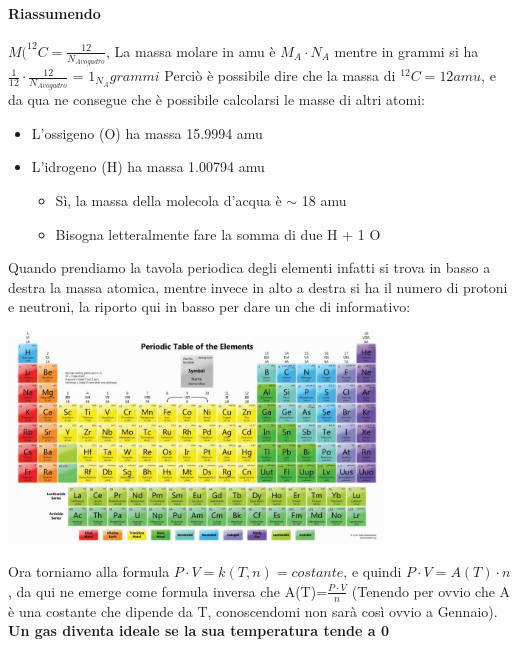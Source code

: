 \documentclass[12pt, a4paper, openany, oneside]{book}
\begin{document}
\paragraph{Riassumendo} $M(^{12}C = \frac{12}{N_{Avogadro}}$, La massa molare in amu è
$M_{A} \cdot N_{A}$  mentre in grammi si ha $\frac{1}{12} \cdot \frac{12}
{N_{Avogadro}}$ = $1_{N_{A}} grammi$
Perciò è possibile dire che la massa di $^{12}C = 12 amu$, e da qua ne consegue
che è possibile calcolarsi le masse di altri atomi:
\begin{itemize}
	\item L'ossigeno (O) ha massa 15.9994 amu
	\item L'idrogeno (H) ha massa 1.00794 amu
	\begin{itemize}
		\item Sì, la massa della molecola d'acqua è $\sim$ 18 amu
		\item Bisogna letteralmente fare la somma di due H + 1 O 
	\end{itemize}
\end{itemize}            
Quando prendiamo la tavola periodica degli elementi infatti si trova in basso 
a destra la massa atomica, mentre invece in alto a destra si ha il numero di
protoni e neutroni, la riporto qui in basso per dare un che di informativo:
\begin{center}
\includegraphics[width=0.75\textwidth]{14}
\end{center}
Ora torniamo alla formula $P\cdot V = k(T,n) = costante$, e quindi $P\cdot V = 
A(T) \cdot n$, da qui ne emerge come formula inversa che A(T)=$\frac{P\cdot V}
{n}$ (Tenendo per ovvio che A è una costante che dipende da T, conoscendomi non 
sarà così ovvio a Gennaio). \textbf{Un gas diventa ideale se la sua temperatura 
tende a 0}
\end{document}
